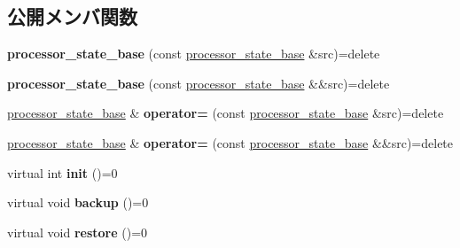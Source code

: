 \subsection*{公開メンバ関数}
\begin{DoxyCompactItemize}
\item 
\hypertarget{classprocessor__state__base_a8a5444f4f1343d5a0ec699b08003f793}{}{\bfseries processor\+\_\+state\+\_\+base} (const \hyperlink{classprocessor__state__base}{processor\+\_\+state\+\_\+base} \&src)=delete\label{classprocessor__state__base_a8a5444f4f1343d5a0ec699b08003f793}

\item 
\hypertarget{classprocessor__state__base_a279491bbdf2128e13415e12b998fdc2e}{}{\bfseries processor\+\_\+state\+\_\+base} (const \hyperlink{classprocessor__state__base}{processor\+\_\+state\+\_\+base} \&\&src)=delete\label{classprocessor__state__base_a279491bbdf2128e13415e12b998fdc2e}

\item 
\hypertarget{classprocessor__state__base_a93975feff3d07c035f39cf756c59c5c9}{}\hyperlink{classprocessor__state__base}{processor\+\_\+state\+\_\+base} \& {\bfseries operator=} (const \hyperlink{classprocessor__state__base}{processor\+\_\+state\+\_\+base} \&src)=delete\label{classprocessor__state__base_a93975feff3d07c035f39cf756c59c5c9}

\item 
\hypertarget{classprocessor__state__base_a99397522239060856bcca363c221e279}{}\hyperlink{classprocessor__state__base}{processor\+\_\+state\+\_\+base} \& {\bfseries operator=} (const \hyperlink{classprocessor__state__base}{processor\+\_\+state\+\_\+base} \&\&src)=delete\label{classprocessor__state__base_a99397522239060856bcca363c221e279}

\item 
\hypertarget{classprocessor__state__base_a30d2bc178c4a436997713e97c7a722e6}{}virtual int {\bfseries init} ()=0\label{classprocessor__state__base_a30d2bc178c4a436997713e97c7a722e6}

\item 
\hypertarget{classprocessor__state__base_a1b3fb544ee8eead6f1c74e31d74ab8d5}{}virtual void {\bfseries backup} ()=0\label{classprocessor__state__base_a1b3fb544ee8eead6f1c74e31d74ab8d5}

\item 
\hypertarget{classprocessor__state__base_a4d5c92c17471b9d84e0d520b89c3bfb8}{}virtual void {\bfseries restore} ()=0\label{classprocessor__state__base_a4d5c92c17471b9d84e0d520b89c3bfb8}


\end{DoxyCompactItemize}
